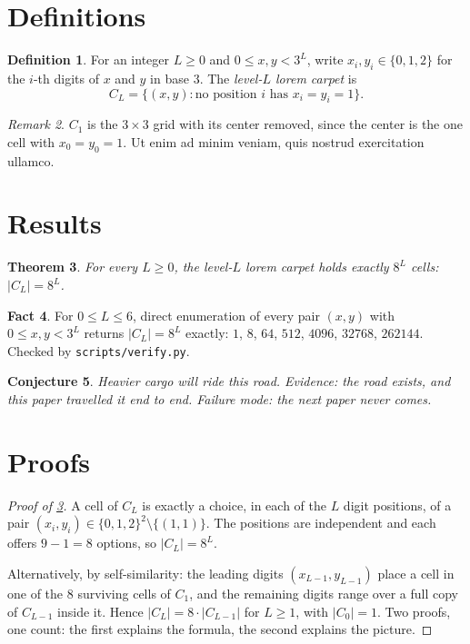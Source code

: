 \documentclass[11pt]{amsart}
\newtheorem{theorem}{Theorem}[section]
\newtheorem{conjecture}[theorem]{Conjecture}
\theoremstyle{definition}
\newtheorem{definition}[theorem]{Definition}
\newtheorem{fact}[theorem]{Fact}
\theoremstyle{remark}
\newtheorem{remark}[theorem]{Remark}
\begin{document}
\section{Definitions}

\begin{definition}
\label{def:carpet}
For an integer $L \ge 0$ and $0 \le x, y < 3^L$, write $x_i, y_i \in \{0, 1, 2\}$ for the $i$-th digits of $x$ and $y$ in base $3$. The \emph{level-$L$ lorem carpet} is
\[
C_L = \bigl\{ (x, y) : \text{no position } i \text{ has } x_i = y_i = 1 \bigr\}.
\]
\end{definition}

\begin{remark}
$C_1$ is the $3 \times 3$ grid with its center removed, since the center is the one cell with $x_0 = y_0 = 1$. Ut enim ad minim veniam, quis nostrud exercitation ullamco.
\end{remark}

\section{Results}

\begin{theorem}
\label{thm:count}
For every $L \ge 0$, the level-$L$ lorem carpet holds exactly $8^L$ cells: $\lvert C_L \rvert = 8^L$.
\end{theorem}

\begin{fact}
\label{fact:machine}
For $0 \le L \le 6$, direct enumeration of every pair $(x, y)$ with $0 \le x, y < 3^L$ returns $\lvert C_L \rvert = 8^L$ exactly: $1$, $8$, $64$, $512$, $4096$, $32768$, $262144$. Checked by \texttt{scripts/verify.py}.
\end{fact}

\begin{conjecture}
\label{con:cargo}
Heavier cargo will ride this road. Evidence: the road exists, and this paper travelled it end to end. Failure mode: the next paper never comes.
\end{conjecture}

\section{Proofs}
\label{sec:proofs}

\begin{proof}[Proof of \cref{thm:count}]
A cell of $C_L$ is exactly a choice, in each of the $L$ digit positions, of a pair $(x_i, y_i) \in \{0, 1, 2\}^2 \setminus \{(1, 1)\}$. The positions are independent and each offers $9 - 1 = 8$ options, so $\lvert C_L \rvert = 8^L$.

Alternatively, by self-similarity: the leading digits $(x_{L-1}, y_{L-1})$ place a cell in one of the $8$ surviving cells of $C_1$, and the remaining digits range over a full copy of $C_{L-1}$ inside it. Hence $\lvert C_L \rvert = 8 \cdot \lvert C_{L-1} \rvert$ for $L \ge 1$, with $\lvert C_0 \rvert = 1$. Two proofs, one count: the first explains the formula, the second explains the picture.
\end{proof}
\end{document}
